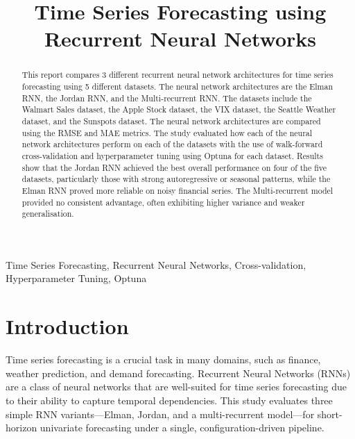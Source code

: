\documentclass[conference]{IEEEtran}
\begin{document}
\title{Time Series Forecasting using Recurrent Neural Networks}

\author{
}


\maketitle

\begin{abstract}
This report compares 3 different recurrent neural network architectures for time series forecasting using 5 different datasets. The neural network architectures are the Elman RNN, the Jordan RNN, and the Multi-recurrent RNN. The datasets include the Walmart Sales dataset, the Apple Stock dataset, the VIX dataset, the Seattle Weather dataset, and the Sunspots dataset. The neural network architectures are compared using the RMSE and MAE metrics. The study evaluated how each of the neural network architectures perform on each of the datasets with the use of walk-forward cross-validation and hyperparameter tuning using Optuna for each dataset. Results show that the Jordan RNN achieved the best overall performance on four of the five datasets, particularly those with strong autoregressive or seasonal patterns, while the Elman RNN proved more reliable on noisy financial series. The Multi-recurrent model provided no consistent advantage, often exhibiting higher variance and weaker generalisation.
\smallbreak
\end{abstract}
\begin{IEEEkeywords}
Time Series Forecasting, Recurrent Neural Networks, Cross-validation, Hyperparameter Tuning, Optuna
\end{IEEEkeywords}
\noindent


\section{\textbf{Introduction}}
Time series forecasting is a crucial task in many domains, such as finance, weather prediction, and demand forecasting. Recurrent Neural Networks (RNNs) are a class of neural networks that are well-suited for time series forecasting due to their ability to capture temporal dependencies. This study evaluates three simple RNN variants—Elman, Jordan, and a multi-recurrent model—for short-horizon univariate forecasting under a single, configuration-driven pipeline.
\end{document}
